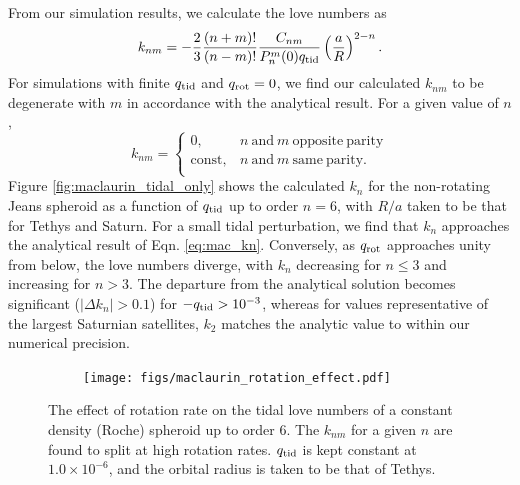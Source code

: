 From our simulation results, we calculate the love numbers as
%
\begin{equation}
\begin{aligned}
    k_{nm} = -\frac{2}{3}\frac{(n+m)!}{(n-m)!}\frac{C_{nm}}{P_n^m(0)q_{\rm tid}}
    \left( \frac{a}{R} \right)^{2-n}.
\end{aligned}
\label{eq:kn}
\end{equation}
%
For simulations with finite $q_{\rm tid}$ and $q_{\rm rot}=0$, we find our calculated
$k_{nm}$ to be degenerate with $m$ in accordance with the analytical result. For a
given value of $n$, 
%
\begin{equation}
    k_{nm} = \begin{cases}
        0, & n \mathrm{~and~} m \mathrm{~opposite~parity} \\
        \mathrm{const}, & n \mathrm{~and~} m \mathrm{~same~parity}. \\
    \end{cases}
    \label{eq:degenerate}
\end{equation}
%
Figure \ref{fig:maclaurin_tidal_only} shows the calculated $k_n$ for the non-rotating
Jeans spheroid as a function of $q_{\rm tid}$ up to order $n=6$, with $R/a$ taken
to be that for Tethys and Saturn. For a small tidal perturbation, we find that $k_n$
approaches the analytical result of Eqn. \eqref{eq:mac_kn}. Conversely, as $q_{\rm
rot}$ approaches unity from below, the love numbers diverge, with $k_n$ decreasing
for $n\leq3$ and increasing for $n>3$. The departure from the analytical solution
becomes significant ($\left|\Delta k_n\right| > 0.1$) for $-q_{\rm tid}>10^{-3}$,
whereas for values representative of the largest Saturnian satellites, $k_2$ matches
the analytic value to within our numerical precision.

\begin{figure}[h!]  
  \centering
    \texttt{[image: figs/maclaurin\_rotation\_effect.pdf]}
\caption{ The effect of rotation rate on the tidal love numbers of a constant density
    (Roche) spheroid up to order 6. The $k_{nm}$ for a given $n$ are found to split
    at high rotation rates. $q_{\rm tid}$ is kept constant at $1.0\times10^{-6}$, and
    the orbital radius is taken to be that of Tethys.}
\label{fig:maclaurin_rotation_effect}
\end{figure}

